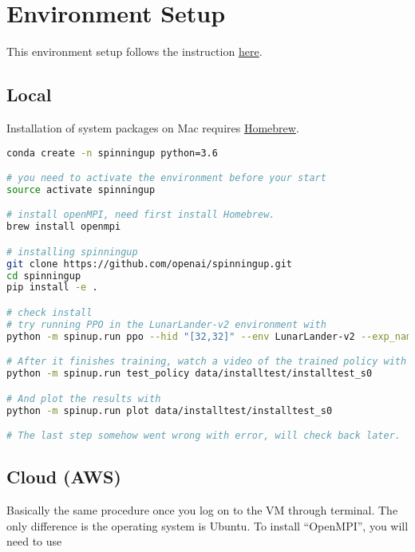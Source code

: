 \section{Environment Setup}

This environment setup follows the instruction \href{https://spinningup.openai.com/en/latest/user/installation.html#installing-python}{here}. 

\subsection{Local}

Installation of system packages on Mac requires \href{https://brew.sh/}{Homebrew}.%

\begin{lstlisting}[language=bash,caption={Setup SpinningUp Environment}] 
conda create -n spinningup python=3.6

# you need to activate the environment before your start
source activate spinningup   

# install openMPI, need first install Homebrew. 
brew install openmpi  

# installing spinningup
git clone https://github.com/openai/spinningup.git
cd spinningup
pip install -e .

# check install
# try running PPO in the LunarLander-v2 environment with
python -m spinup.run ppo --hid "[32,32]" --env LunarLander-v2 --exp_name installtest --gamma 0.999

# After it finishes training, watch a video of the trained policy with
python -m spinup.run test_policy data/installtest/installtest_s0

# And plot the results with
python -m spinup.run plot data/installtest/installtest_s0

# The last step somehow went wrong with error, will check back later. 

\end{lstlisting}

\subsection{Cloud (AWS)}

Basically the same procedure once you log on to the VM through terminal. The only difference is the operating system is Ubuntu. To install ``OpenMPI'', you will need to use 

